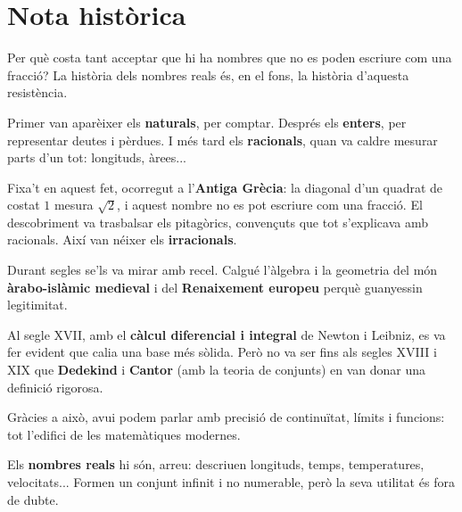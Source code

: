\section{Nota històrica}

Per què costa tant acceptar que hi ha nombres que no es poden escriure com una fracció? La història dels nombres reals és, en el fons, la història d'aquesta resistència.

Primer van aparèixer els \textbf{naturals}, per comptar. Després els \textbf{enters}, per representar deutes i pèrdues. I més tard els \textbf{racionals}, quan va caldre mesurar parts d'un tot: longituds, àrees...

Fixa't en aquest fet, ocorregut a l'\textbf{Antiga Grècia}: la diagonal d'un quadrat de costat $1$ mesura $\sqrt{2}$, i aquest nombre no es pot escriure com una fracció. El descobriment va trasbalsar els pitagòrics, convençuts que tot s'explicava amb racionals. Així van néixer els \textbf{irracionals}.

Durant segles se'ls va mirar amb recel. Calgué l'àlgebra i la geometria del món \textbf{àrabo-islàmic medieval} i del \textbf{Renaixement europeu} perquè guanyessin legitimitat.

Al segle XVII, amb el \textbf{càlcul diferencial i integral} de Newton i Leibniz, es va fer evident que calia una base més sòlida. Però no va ser fins als segles XVIII i XIX que \textbf{Dedekind} i \textbf{Cantor} (amb la teoria de conjunts) en van donar una definició rigorosa.

Gràcies a això, avui podem parlar amb precisió de continuïtat, límits i funcions: tot l'edifici de les matemàtiques modernes.

Els \textbf{nombres reals} hi són, arreu: descriuen longituds, temps, temperatures, velocitats... Formen un conjunt infinit i no numerable, però la seva utilitat és fora de dubte.
